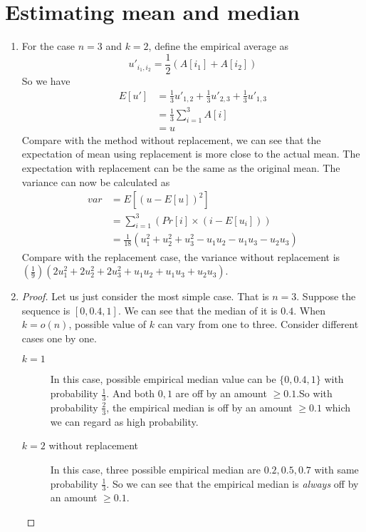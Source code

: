 \documentclass{article}
\begin{document}
	\section{Estimating mean and median}
		\begin{enumerate}
			\item For the case $n = 3$ and $k = 2$, define the empirical average as \begin{equation}
				u'_{i_1,i_2} = \frac{1}{2}(A\left[i_1\right] + A\left[i_2\right]) 
			\end{equation}
			So we have \begin{align}
				E\left[u'\right] &= \frac{1}{3} u'_{1, 2} + \frac{1}{3} u'_{2, 3} + \frac{1}{3}u'_{1, 3} \\
					&= \frac{1}{3}  \sum_{i = 1}^3 A\left[i\right]\\
					&= u
			\end{align}
			Compare with the method without replacement, we can see that the expectation of mean using replacement is more close to the actual mean. The expectation with replacement can be the same as the original mean.
			The variance can now be calculated as 
				\begin{align}
				var &= E\left[ (u - E\left[u\right])^2\right] \\&= \sum_{i = 1}^3 (Pr\left[i\right] \times (i - E\left[u_i\right])) \\&= \frac{1}{18}(u_1^2 + u_2^2 + u_3^2 - u_1u_2 - u_1u_3 - u_2u_3)
				\end{align}
			Compare with the replacement case, the variance without replacement is $(\frac{1}{9})(2u_1^2 + 2u_2^2 + 2u_3^2 + u_1u_2 + u_1u_3 + u_2u_3)$.
			\item  \begin{proof}
				Let us just consider the most simple case. That is $n = 3$. Suppose the sequence is $\left[0, 0.4, 1\right]$. We can see that the median of it is $0.4$. When $k = o(n)$, possible value of $k$ can vary from one to three. Consider different cases one by one. \begin{description}
				\item[$k = 1$] In this case, possible empirical median value can be $\{0, 0.4, 1\}$ with probability $\frac{1}{3}$. And both $0, 1$ are off by an amount $\geq 0.1$.So with probability $\frac{2}{3}$, the empirical median is off by an amount $\geq 0.1$ which we can regard as high probability.
				\item[$k = 2$ without replacement] In this case, three possible empirical median are $0.2, 0.5, 0.7$ with same probability $\frac{1}{3}$. So we can see that the empirical median is \emph{always} off by an amount $\geq 0.1$.

\end{description}
\end{proof}
\end{enumerate}
\end{document}

